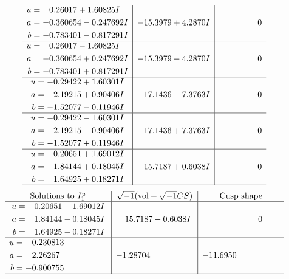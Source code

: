 \documentclass[1p]{elsarticle_modified}
\theoremstyle{definition}
\newcommand{\I}{\sqrt{-1}}
\begin{document}
$$\begin{array}{c|c|c}
\begin{aligned}
u &= \phantom{-}0.26017 + 1.60825 I \\
a &= -0.360654 - 0.247692 I \\
b &= -0.783401 - 0.817291 I\end{aligned}
 & -15.3979 + 4.2870 I & \phantom{-0.000000 } 0 \\ \hline\begin{aligned}
u &= \phantom{-}0.26017 - 1.60825 I \\
a &= -0.360654 + 0.247692 I \\
b &= -0.783401 + 0.817291 I\end{aligned}
 & -15.3979 - 4.2870 I & \phantom{-0.000000 } 0 \\ \hline\begin{aligned}
u &= -0.29422 + 1.60301 I \\
a &= -2.19215 + 0.90406 I \\
b &= -1.52077 - 0.11946 I\end{aligned}
 & -17.1436 - 7.3763 I & \phantom{-0.000000 } 0 \\ \hline\begin{aligned}
u &= -0.29422 - 1.60301 I \\
a &= -2.19215 - 0.90406 I \\
b &= -1.52077 + 0.11946 I\end{aligned}
 & -17.1436 + 7.3763 I & \phantom{-0.000000 } 0 \\ \hline\begin{aligned}
u &= \phantom{-}0.20651 + 1.69012 I \\
a &= \phantom{-}1.84144 + 0.18045 I \\
b &= \phantom{-}1.64925 + 0.18271 I\end{aligned}
 & \phantom{-}15.7187 + 0.6038 I & \phantom{-0.000000 } 0\\
 \hline 
 \end{array}$$\newpage$$\begin{array}{c|c|c}  
\text{Solutions to }I^u_{1}& \I (\text{vol} + \sqrt{-1}CS) & \text{Cusp shape}\\
 \hline 
\begin{aligned}
u &= \phantom{-}0.20651 - 1.69012 I \\
a &= \phantom{-}1.84144 - 0.18045 I \\
b &= \phantom{-}1.64925 - 0.18271 I\end{aligned}
 & \phantom{-}15.7187 - 0.6038 I & \phantom{-0.000000 } 0 \\ \hline\begin{aligned}
u &= -0.230813\phantom{ +0.000000I} \\
a &= \phantom{-}2.26267\phantom{ +0.000000I} \\
b &= -0.900755\phantom{ +0.000000I}\end{aligned}
 & -1.28704\phantom{ +0.000000I} & -11.6950\phantom{ +0.000000I}\\
 \hline 
 \end{array}$$\newpage\newpage\renewcommand{\arraystretch}{1}
\end{document}
